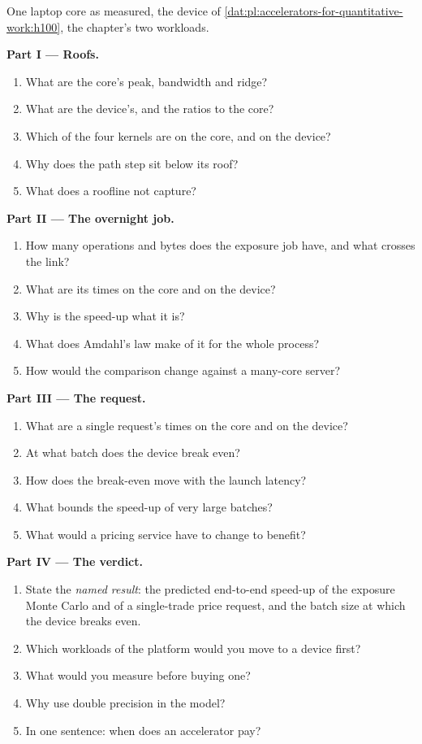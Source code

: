 \begin{problem}\label{pb:pl:accelerators-for-quantitative-work:1}
One laptop core as measured, the device of \cref{dat:pl:accelerators-for-quantitative-work:h100}, the chapter's two workloads.

\medskip\noindent\textbf{Part I --- Roofs.}
\begin{enumerate}
\item What are the core's peak, bandwidth and ridge?
\item What are the device's, and the ratios to the core?
\item Which of the four kernels are  on the core, and on the device?
\item Why does the path step sit below its roof?
\item What does a roofline not capture?
\end{enumerate}

\medskip\noindent\textbf{Part II --- The overnight job.}
\begin{enumerate}[resume]
\item How many operations and bytes does the exposure job have, and what crosses the link?
\item What are its times on the core and on the device?
\item Why is the speed-up what it is?
\item What does Amdahl's law make of it for the whole process?
\item How would the comparison change against a many-core server?
\end{enumerate}

\medskip\noindent\textbf{Part III --- The request.}
\begin{enumerate}[resume]
\item What are a single request's times on the core and on the device?
\item At what batch does the device break even?
\item How does the break-even move with the launch latency?
\item What bounds the speed-up of very large batches?
\item What would a pricing service have to change to benefit?
\end{enumerate}

\medskip\noindent\textbf{Part IV --- The verdict.}
\begin{enumerate}[resume]
\item State the \emph{named result}: the predicted end-to-end speed-up of the exposure Monte Carlo and of a single-trade price request, and
the batch size at which the device breaks even.
\item Which workloads of the platform would you move to a device first?
\item What would you measure before buying one?
\item Why use double precision in the model?
\item In one sentence: when does an accelerator pay?
\end{enumerate}
\end{problem}

